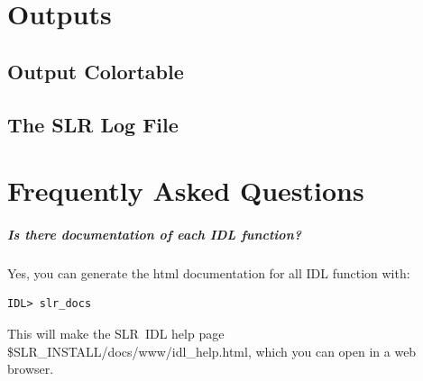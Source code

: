 \documentclass{report}
\newcommand{\slr}{SLR}
\begin{document}
\chapter{Outputs}

\section{Output Colortable}

\section{The SLR Log File}




\chapter{Frequently Asked Questions}


\paragraph{Is there documentation of each IDL function?}

Yes, you can generate the html documentation for all IDL function
with:
\begin{verbatim}
IDL> slr_docs
\end{verbatim}
This will make the \slr\ IDL help page
\$SLR\_INSTALL/docs/www/idl\_help.html, which you can open in a web
browser.







\end{document}
